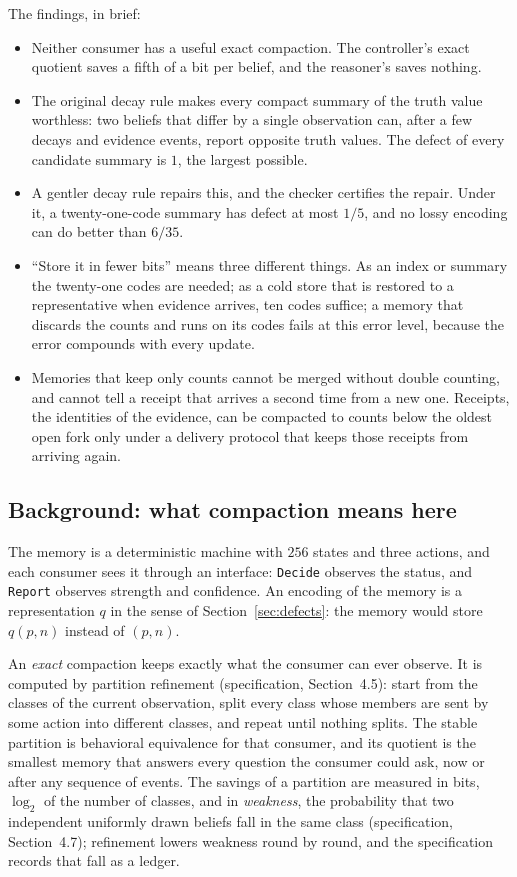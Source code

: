 \documentclass[11pt]{article}
\newcommand{\code}[1]{\texttt{#1}}
\newcommand{\spec}[1]{specification, Section~#1}
\theoremstyle{definition}
\theoremstyle{plain}
\begin{document}
The findings, in brief:
\begin{itemize}
\item Neither consumer has a useful exact compaction. The controller's exact quotient saves a
fifth of a bit per belief, and the reasoner's saves nothing.
\item The original decay rule makes every compact summary of the truth value worthless: two
beliefs that differ by a single observation can, after a few decays and evidence events, report
opposite truth values. The defect of every candidate summary is $1$, the largest possible.
\item A gentler decay rule repairs this, and the checker certifies the repair. Under it, a
twenty-one-code summary has defect at most $1/5$, and no lossy encoding can do better than $6/35$.
\item ``Store it in fewer bits'' means three different things. As an index or summary the
twenty-one codes are needed; as a cold store that is restored to a representative when evidence
arrives, ten codes suffice; a memory that discards the counts and runs on its codes fails at this
error level, because the error compounds with every update.
\item Memories that keep only counts cannot be merged without double counting, and cannot tell a
receipt that arrives a second time from a new one. Receipts, the identities of the evidence, can be
compacted to counts below the oldest open fork only under a delivery protocol that keeps those
receipts from arriving again.
\end{itemize}

\subsection{Background: what compaction means here}

The memory is a deterministic machine with $256$ states and three actions, and each consumer
sees it through an interface: \code{Decide} observes the status, and \code{Report} observes
strength and confidence. An encoding of the memory is a representation $q$ in the sense of
Section~\ref{sec:defects}: the memory would store $q(p,n)$ instead of $(p,n)$.

An \emph{exact} compaction keeps exactly what the consumer can ever observe. It is computed by
partition refinement (\spec{4.5}): start from the classes of the current observation, split every
class whose members are sent by some action into different classes, and repeat until nothing
splits. The stable partition is behavioral equivalence for that consumer, and its quotient is the
smallest memory that answers every question the consumer could ask, now or after any sequence of
events. The savings of a partition are measured in bits, $\log_2$ of the number of classes, and in
\emph{weakness}, the probability that two independent uniformly drawn beliefs fall in the same
class (\spec{4.7}); refinement lowers weakness round by round, and the specification records that
fall as a ledger.
\end{document}
